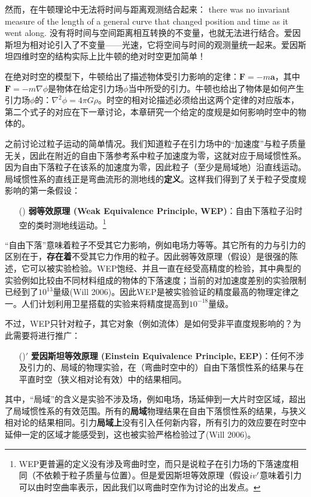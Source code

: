 然而，在牛顿理论中无法将时间与距离观测结合起来： there was no invariant measure of the length of a general curve that changed position and time as it went along. 没有将时间与空间距离相互转换的不变量，也就无法进行结合。爱因斯坦为相对论引入了不变量——光速，它将空间与时间的观测量统一起来。爱因斯坦四维时空的结构实际上比牛顿的绝对时空更加简单！

在绝对时空的模型下，牛顿给出了描述物体受引力影响的定律：$\bm{F} = -m \bm{a}$，其中$\bm{F} = -m \nabla \phi$是物体在给定引力场$\phi$当中所受的引力。牛顿也给出了物体是如何产生引力场$\phi$的：$\nabla^2 \phi = 4\pi G \rho$。时空的相对论描述必须给出这两个定律的对应版本，第二个式子的对应在下一章讨论，本章研究一个给定的度规是如何影响时空中的物体的。

之前讨论过粒子运动的简单情况。我们知道粒子在引力场中的“加速度”与粒子质量无关，因此在附近的自由下落参考系中粒子加速度为零，这就对应于局域惯性系。因为自由下落粒子在该系的加速度为零，因此粒子（至少是局域地）沿直线运动。局域惯性系的直线正是弯曲流形的测地线的\textbf{定义}。这样我们得到了关于粒子受度规影响的第一条假设：

\begin{shaded}
\begin{enumerate}
    \item[(\uppercase\expandafter{\romannumeral4})] \textbf{弱等效原理 (Weak Equivalence Principle, WEP)}：自由下落粒子沿时空的类时测地线运动。\footnote{WEP更普遍的定义没有涉及弯曲时空，而只是说粒子在引力场的下落速度相同（不依赖于粒子质量与位置）。但是爱因斯坦等效原理（假设$\uppercase\expandafter{\romannumeral4}'$意味着引力可以由时空曲率表示，因此我们以弯曲时空作为讨论的出发点。}
\end{enumerate}
\end{shaded}
“自由下落”意味着粒子不受其它力影响，例如电场力等等。其它所有的力与引力的区别在于，\textbf{存在着}不受其它力作用的粒子。因此弱等效原理（假设\uppercase\expandafter{}）是很强的陈述，它可以被实验检验。WEP饱经、并且一直在经受高精度的检验，其中典型的实验例如比较由不同材料组成的物体的下落速度；当前的对加速度差别的实验限制已经到了$10^{13}$量级(Will 2006)。因此WEP是被实验验证的精度最高的物理定律之一。人们计划利用卫星搭载的实验来将精度提高到$10^{-18}$量级。

不过，WEP只针对粒子，其它对象（例如流体）是如何受非平直度规影响的？为此需要将\uppercase\expandafter{}进行推广：

\begin{shaded}
\begin{enumerate}
    \item[(\uppercase\expandafter{\romannumeral4})$'$] \textbf{爱因斯坦等效原理 (Einstein Equivalence Principle, EEP)}：任何不涉及引力的、局域的物理实验，在（弯曲时空中的）自由下落惯性系的结果与在平直时空（狭义相对论有效）中的结果相同。
\end{enumerate}
\end{shaded}
其中，“局域”的含义是实验不涉及场，例如电场，场延伸到一大片时空区域，超出了局域惯性系的有效范围。所有的\textbf{局域}物理结果在自由下落惯性系的结果，与狭义相对论的结果相同。引力\textbf{局域上}没有引入任何新内容，所有引力的效应要在时空中延伸一定的区域才能感受到，这也被实验严格检验过了(Will 2006)。

